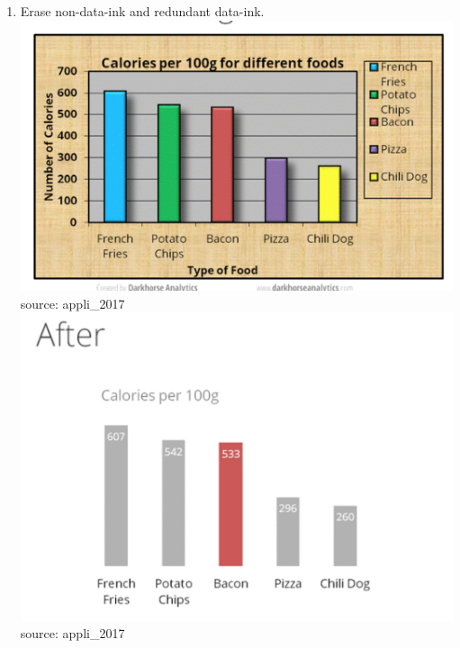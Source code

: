 \documentclass[]{book}
\theoremstyle{definition}
\theoremstyle{definition}
\theoremstyle{definition}
\theoremstyle{remark}
\begin{document}
\begin{enumerate}
\def\labelenumi{\arabic{enumi}.}
\setcounter{enumi}{1}
\item
  Erase non-data-ink and redundant data-ink.
  \includegraphics{images/Tufte_figure2.png} source: appli\_2017
  \includegraphics{images/Tufte_figure3.png} source: appli\_2017


\end{enumerate}
\end{document}
